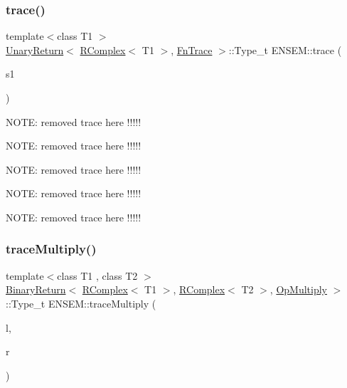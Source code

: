\mbox{\label{group__rcomplex_ga9f6f9e69dbfccacb954b9fd9947ca592}} 
\subsubsection{\texorpdfstring{trace()}{trace()}}
{\footnotesize\ttfamily template$<$class T1 $>$ \\
\mbox{\hyperlink{structENSEM_1_1UnaryReturn}{Unary\+Return}}$<$ \mbox{\hyperlink{classENSEM_1_1RComplex}{R\+Complex}}$<$ T1 $>$, \mbox{\hyperlink{structENSEM_1_1FnTrace}{Fn\+Trace}} $>$\+::Type\+\_\+t E\+N\+S\+E\+M\+::trace (\begin{DoxyParamCaption}\item[{const \mbox{\hyperlink{classENSEM_1_1RComplex}{R\+Complex}}$<$ T1 $>$ \&}]{s1 }\end{DoxyParamCaption})\hspace{0.3cm}{\ttfamily [inline]}}

N\+O\+TE\+: removed trace here !!!!!

N\+O\+TE\+: removed trace here !!!!!

N\+O\+TE\+: removed trace here !!!!!

N\+O\+TE\+: removed trace here !!!!!

N\+O\+TE\+: removed trace here !!!!! \mbox{\label{group__rcomplex_gaf1ed70437ca66203b33532ddb96e2657}} 
\subsubsection{\texorpdfstring{traceMultiply()}{traceMultiply()}}
{\footnotesize\ttfamily template$<$class T1 , class T2 $>$ \\
\mbox{\hyperlink{structENSEM_1_1BinaryReturn}{Binary\+Return}}$<$ \mbox{\hyperlink{classENSEM_1_1RComplex}{R\+Complex}}$<$ T1 $>$, \mbox{\hyperlink{classENSEM_1_1RComplex}{R\+Complex}}$<$ T2 $>$, \mbox{\hyperlink{structENSEM_1_1OpMultiply}{Op\+Multiply}} $>$\+::Type\+\_\+t E\+N\+S\+E\+M\+::trace\+Multiply (\begin{DoxyParamCaption}\item[{const \mbox{\hyperlink{classENSEM_1_1RComplex}{R\+Complex}}$<$ T1 $>$ \&}]{l,  }\item[{const \mbox{\hyperlink{classENSEM_1_1RComplex}{R\+Complex}}$<$ T2 $>$ \&}]{r }\end{DoxyParamCaption})\hspace{0.3cm}{\ttfamily [inline]}}



